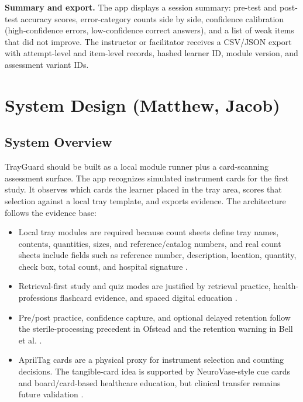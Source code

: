 \documentclass[10pt,a4paper]{article}
\begin{document}
\textbf{Summary and export.}
The app displays a session summary: pre-test and post-test accuracy
scores, error-category counts side by side, confidence calibration
(high-confidence errors, low-confidence correct answers), and a list of
weak items that did not improve. The instructor or facilitator receives
a CSV/JSON export with attempt-level and item-level records, hashed
learner ID, module version, and assessment variant IDs.






\section{System Design \hfill {\normalfont\small (Matthew, Jacob)}}
\label{sec:system-design}
\subsection{System Overview}


TrayGuard should be built as a local module runner plus a card-scanning
assessment surface. The app recognizes simulated instrument cards for the
first study. It observes which cards the learner placed in the tray area, scores
that selection against a local tray template, and exports evidence.
The architecture follows the evidence base:
\begin{itemize}
  \item Local tray modules are required because count sheets define tray names, contents, quantities, sizes, and reference/catalog numbers, and real count sheets include fields such as reference number, description, location, quantity, check box, total count, and hospital signature \cite{nadeau-2024, stryker-gamma4-count-sheet-2023, stryker-imn-count-sheet-2023}.
  \item Retrieval-first study and quiz modes are justified by retrieval practice, health-professions flashcard evidence, and spaced digital education \cite{roediger-and-karpicke-2006, barrison-et-al-2025, martinengo-et-al-2024}.
  \item Pre/post practice, confidence capture, and optional delayed retention follow the sterile-processing precedent in Ofstead and the retention warning in Bell et al. \cite{ofstead-et-al-2023, bell-et-al-2008}.
   \item AprilTag cards are a physical proxy for instrument selection and counting decisions. The tangible-card idea is supported by NeuroVase-style cue cards and board/card-based healthcare education, but clinical transfer remains future validation \cite{jahani-et-al-2026-neurovase, ward-et-al-2019}.
\end{itemize}
\end{document}
